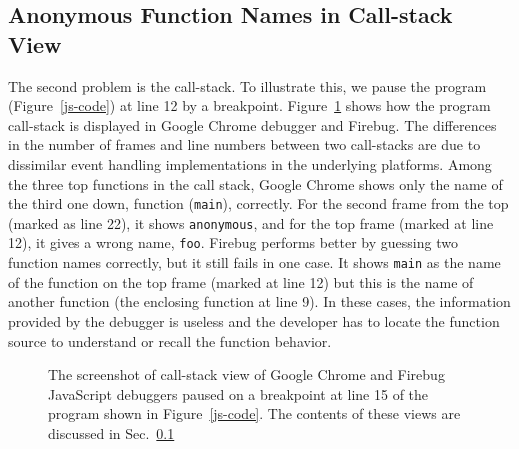 \documentclass[10pt, preprint]{sigplanconf}
\begin{document}
\subsection{Anonymous Function Names in Call-stack View}
\label{sec:callstack}
The second problem is the call-stack.
To illustrate this, we pause the program (Figure~\ref{js-code}) at line 12 by a breakpoint. Figure~\ref{debuggers-callstack} shows how the program call-stack is displayed in Google Chrome debugger and Firebug. The differences in the number of frames and line numbers between two call-stacks are due to dissimilar event handling implementations in the underlying platforms. Among the three top functions in the call stack, Google Chrome shows only the name of the third one down, function (\verb|main|), correctly. For the second frame from the top (marked as line 22), it shows \verb|anonymous|, and for the top frame (marked at line 12), it gives a wrong name, \verb|foo|. Firebug performs better by guessing two function names correctly, but it still fails in one case. It shows \verb|main| as the name of the function on the top frame (marked at line 12) but this is the name of another function (the enclosing function at line 9). In these cases, the information provided by the debugger is useless and the developer has to locate the function source to understand or recall the function behavior. 

\begin{figure}[htp]
\centerline{
\hfil
{}}
\caption{The screenshot of call-stack view of Google Chrome and Firebug JavaScript debuggers paused on a breakpoint at line 15 of the program shown in Figure~\ref{js-code}. The contents of these views are discussed in Sec.~\ref{sec:callstack} }
\label{debuggers-callstack}
\end{figure}
 
\end{document}
